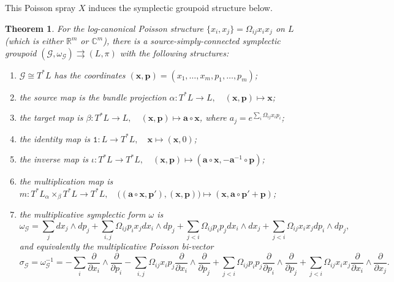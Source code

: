 \documentclass{amsart}
\newtheorem{theorem}{Theorem}[section]
\numberwithin{equation}{section}
\newcommand{\bfa}{{\boldsymbol{a}}}
\newcommand{\bfp}{{\boldsymbol{p}}}
\newcommand{\bfx}{{\boldsymbol{x}}}
\newcommand{\cG}{\mathcal{G}}
\newcommand{\CC}{\mathbb{C}}
\newcommand{\RR}{\mathbb{R}}
\newcommand{\rra}{\rightrightarrows}
\begin{document}
This Poisson spray $X$ induces the symplectic groupoid structure below.
\begin{theorem} 
  \label{thm:PoiSpLogC}
  For the log-canonical Poisson structure $\{x_i, x_j\} = \Omega_{ij} x_i x_j$ on $L$ (which is either $\RR^m$ or $\CC^m$), there is a source-simply-connected symplectic groupoid $(\cG, \omega_\cG) \rra (L, \pi)$ with the following structures:
  \begin{enumerate}
    \item $\cG \cong T^*L$ has the coordinates $(\bfx, \bfp) = (x_1, \ldots, x_m, p_1, \ldots, p_m)$;
    \item the source map is the bundle projection $\alpha: T^*L \to L, \quad (\bfx, \bfp) \mapsto \bfx$;
    \item the target map is $\beta: T^*L \to L, \quad (\bfx, \bfp) \mapsto \bfa \circ \bfx$, where $a_j = e^{\sum_i \Omega_{ij} x_ip_i}$;
    \item the identity map is $\mathtt{1}: L \to T^*L, \quad \bfx \mapsto (\bfx, 0)$;
    \item the inverse map is $\iota: T^*L \to T^*L, \quad (\bfx, \bfp) \mapsto (\bfa \circ \bfx, -\bfa^{-1} \circ \bfp)$;
    \item the multiplication map is $m: T^*L {_\alpha \times_\beta} T^*L \to T^*L, \quad \big((\bfa \circ \bfx, \bfp'), (\bfx, \bfp)\big) \mapsto (\bfx, \bfa \circ \bfp' + \bfp)$;
    \item the multiplicative symplectic form $\omega$ is
      \begin{equation*}
	\omega_\cG = \sum_{j} dx_j \wedge dp_j + \sum_{i, j} \Omega_{ij}p_ix_j dx_i \wedge dp_j + \sum_{j < i} \Omega_{ij}p_ip_j dx_i \wedge dx_j + \sum_{j < i} \Omega_{ij}x_ix_j dp_i \wedge dp_j, 
      \end{equation*}
      and equivalently the multiplicative Poisson bi-vector
      \begin{equation*}
      	\sigma_\cG = \omega_\cG^{-1} = -\sum_{i} \frac{\partial}{\partial x_i} \wedge \frac{\partial}{\partial p_i} - \sum_{i, j} \Omega_{ij} x_i p_j \frac{\partial}{\partial x_i} \wedge \frac{\partial}{\partial p_j} +\sum_{j < i} \Omega_{ij}p_ip_j \frac{\partial}{\partial p_i} \wedge \frac{\partial}{\partial p_j} +\sum_{j < i} \Omega_{ij}x_ix_j \frac{\partial}{\partial x_i} \wedge \frac{\partial}{\partial x_j}.
      \end{equation*}
  \end{enumerate}
\end{theorem}
\end{document}
